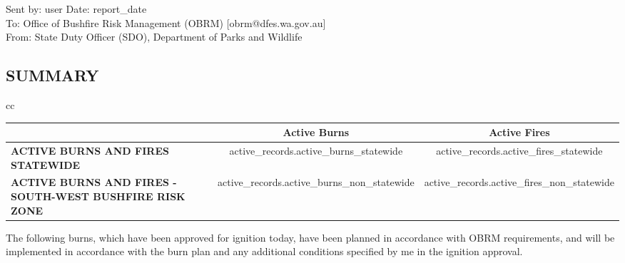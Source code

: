 
\noindent Sent by: {{ user }}\hfill Date: {{report_date}} \\
\noindent To: Office of Bushfire Risk Management (OBRM) [obrm@dfes.wa.gov.au] \\
\noindent From: State Duty Officer (SDO), Department of Parks and Wildlife
\subsection{\hfil SUMMARY \hfil}

\vspace{5mm}
\begin{table}[h]
\begin{tabular}{cc}
    \begin{minipage}{.4\linewidth}
        \begin{tabular} { | l | c | c | }
        \cline{2-3}
        \multicolumn{1}{c|}{} & Active Burns & Active Fires \\
        \hline
        \textbf{ACTIVE BURNS AND FIRES STATEWIDE} & {{ active_records.active_burns_statewide }} & {{ active_records.active_fires_statewide  }} \\
        \hline
        \textbf{ACTIVE BURNS AND FIRES - SOUTH-WEST BUSHFIRE RISK ZONE} & {{ active_records.active_burns_non_statewide }} & {{ active_records.active_fires_non_statewide  }} \\
        \hline
        \end{tabular}
    \end{minipage}

\end{tabular}
\end{table}

\vspace{5mm}
The following burns, which have been approved for ignition today, have been planned in accordance with OBRM requirements, and will be implemented in accordance with the burn plan and any additional conditions specified by me in the ignition approval.

